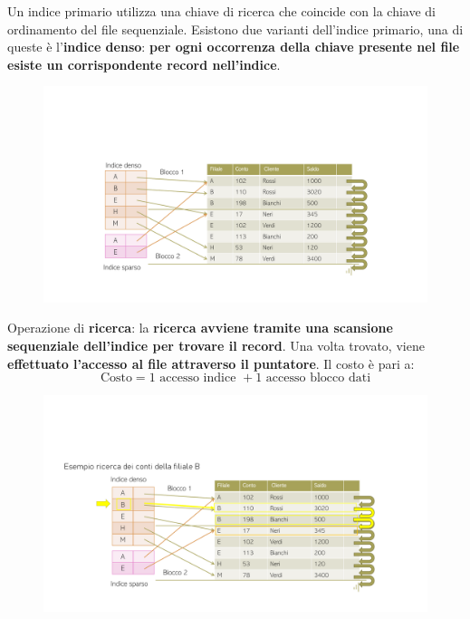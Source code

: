 \documentclass[a4paper]{article}
\begin{document}
\begin{enumerate}
		Un indice primario utilizza una chiave di ricerca che coincide con la chiave di ordinamento del file sequenziale. Esistono due varianti dell'indice primario, una di queste è l'\textbf{indice denso}: \textbf{per ogni occorrenza della chiave presente nel file esiste un corrispondente record nell'indice}.
		\begin{figure}[!htp]
			\centering
			\includegraphics[width=\textwidth]{img/ex/indice-denso-1.pdf}
		\end{figure}
		
		\noindent
		Operazione di \textbf{ricerca}: la \textbf{ricerca avviene tramite una scansione sequenziale dell'indice per trovare il record}. Una volta trovato, viene \textbf{effettuato l'accesso al file attraverso il puntatore}. Il costo è pari a:
		\begin{equation*}
			\text{Costo} = 1 \text{ accesso indice } + 1 \text{ accesso blocco dati}
		\end{equation*}
		\begin{figure}[!htp]
			\centering
			\includegraphics[width=\textwidth]{img/ex/indice-denso-2.pdf}
		\end{figure}
		

\end{enumerate}
\end{document}
